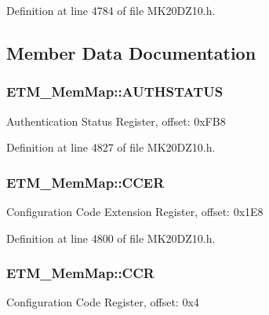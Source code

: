 Definition at line 4784 of file M\+K20\+D\+Z10.\+h.



\subsection{Member Data Documentation}
\subsubsection[{\texorpdfstring{A\+U\+T\+H\+S\+T\+A\+T\+US}{AUTHSTATUS}}]{ E\+T\+M\+\_\+\+Mem\+Map\+::\+A\+U\+T\+H\+S\+T\+A\+T\+US}\hypertarget{struct_e_t_m___mem_map_a51a11fd9f2d1c734621098efd2b71493}{}\label{struct_e_t_m___mem_map_a51a11fd9f2d1c734621098efd2b71493}
Authentication Status Register, offset\+: 0x\+F\+B8 

Definition at line 4827 of file M\+K20\+D\+Z10.\+h.

\subsubsection[{\texorpdfstring{C\+C\+ER}{CCER}}]{ E\+T\+M\+\_\+\+Mem\+Map\+::\+C\+C\+ER}\hypertarget{struct_e_t_m___mem_map_a94aeaa48b0535d838c20834618b26f4a}{}\label{struct_e_t_m___mem_map_a94aeaa48b0535d838c20834618b26f4a}
Configuration Code Extension Register, offset\+: 0x1\+E8 

Definition at line 4800 of file M\+K20\+D\+Z10.\+h.

\subsubsection[{\texorpdfstring{C\+CR}{CCR}}]{ E\+T\+M\+\_\+\+Mem\+Map\+::\+C\+CR}\hypertarget{struct_e_t_m___mem_map_ae429b2d6bbe8b448eefc4e9a19ef6435}{}\label{struct_e_t_m___mem_map_ae429b2d6bbe8b448eefc4e9a19ef6435}
Configuration Code Register, offset\+: 0x4 

